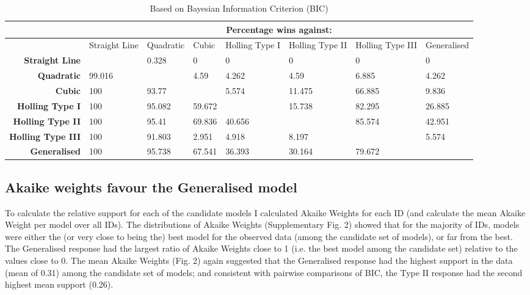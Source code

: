 \documentclass[11pt]{article}
\begin{document}
\begin{landscape}
\begin{table}[ht]
    \bigskip
    \begin{subtable}{1\textwidth}
    \centering
    \caption{Based on Bayesian Information Criterion (BIC)}\label{tab:sub_second}   
    \begin{tabular}{|r|lllllll|}
        \hline
        & \multicolumn{7}{c|}{Percentage wins against:} \\ 
        \toprule
       & Straight Line & Quadratic & Cubic & Holling Type I & Holling Type II & Holling Type III & Generalised \\ 
       \midrule
       {\textbf{Straight Line}} &  & 0.328 & 0 & 0 & 0 & 0 & 0 \\ 
         {\textbf{Quadratic}} & 99.016 &  & 4.59 & 4.262 & 4.59 & 6.885 & 4.262 \\ 
         {\textbf{Cubic}} & 100 & 93.77 &  & 5.574 & 11.475 & 66.885 & 9.836 \\ 
         {\textbf{Holling Type I}} & 100 & 95.082 & 59.672 &  & 15.738 & 82.295 & 26.885 \\ 
         {\textbf{Holling Type II}} & 100 & 95.41 & 69.836 & 40.656 &  & 85.574 & 42.951 \\ 
         {\textbf{Holling Type III}} & 100 & 91.803 & 2.951 & 4.918 & 8.197 &  & 5.574 \\ 
         {\textbf{Generalised}} & 100 & 95.738 & 67.541 & 36.393 & 30.164 & 79.672 &  \\ 
          \bottomrule
      \end{tabular}
       
    \end{subtable}
    
    \end{table}

\end{landscape}
            
        \subsection{Akaike weights favour the Generalised model}            
            To calculate the relative support for each of the candidate models I calculated Akaike Weights for each ID (and calculate the mean Akaike Weight per model over all IDs). The distributions of Akaike Weights (Supplementary Fig. 2) showed that for the majority of IDs, models were either the (or very close to being the) best model for the observed data (among the candidate set of models), or far from the best. The Generalised response had the largest ratio of Akaike Weights close to 1 (i.e. the best model among the candidate set) relative to the values close to 0. The mean Akaike Weights (Fig. 2) again suggested that the Generalised response had the highest support in the data (mean of 0.31) among the candidate set of models; and consistent with pairwise comparisons of BIC, the Type II response had the second highest mean support (0.26).
\end{document}
